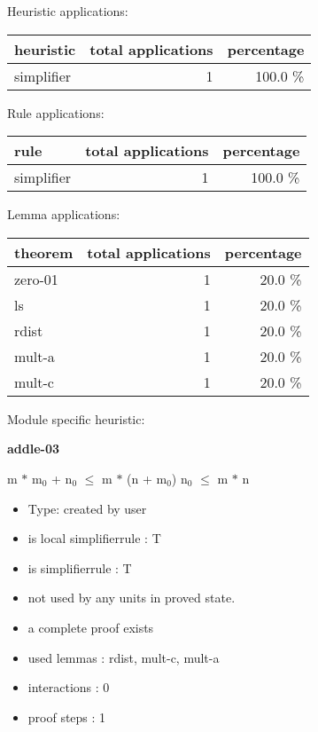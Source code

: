 \documentclass[a4paper]{article}
\begin{document}
\medskip


Heuristic applications:

\begin{supertabular}{l|r|r}
heuristic	& total applications & percentage \\ \hline
simplifier & 1 & 100.0 \% \\

\end{supertabular}

Rule applications:

\begin{supertabular}{l|r|r}
rule	        & total applications & percentage \\ \hline
simplifier & 1 & 100.0 \% \\

\end{supertabular}

Lemma applications:

\begin{supertabular}{l|r|r}
theorem	        & total applications & percentage \\ \hline
zero-01 & 1 & 20.0 \% \\
ls & 1 & 20.0 \% \\
rdist & 1 & 20.0 \% \\
mult-a & 1 & 20.0 \% \\
mult-c & 1 & 20.0 \% \\

\end{supertabular}

Module specific heuristic:

\pagebreak

{\LARGE\bf addle-03}\label{lemma-addle-03}

\medskip

 \Fol m $*$ $\mbox{m}_{0}$ + $\mbox{n}_{0}$ $\le$ m $*$ (n + $\mbox{m}_{0}$) \Equiv $\mbox{n}_{0}$ $\le$ m $*$ n

\begin{itemize}

\item Type: created by user

\item is local simplifierrule : T
\item is simplifierrule : T
\item not used by any units in proved state.
\item       a complete proof exists
\item       used lemmas  : rdist, mult-c, mult-a
\item       interactions : 0
\item       proof steps  : 1
\end{itemize}
\end{document}
